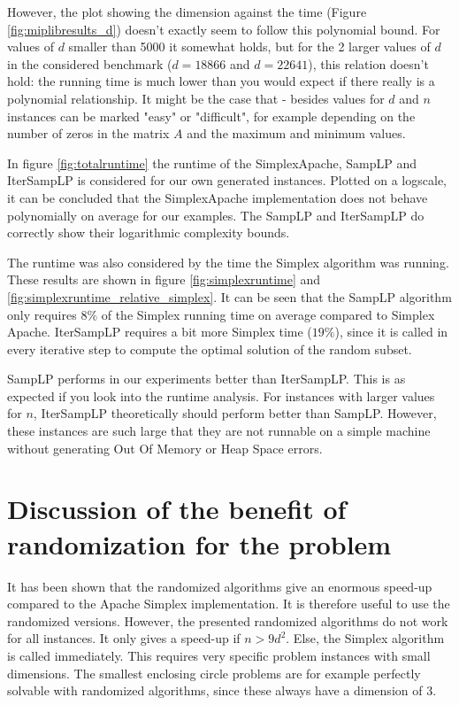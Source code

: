 \documentclass[nocopyrightspace]{acm_proc_article-sp}
\begin{document}
However, the plot showing the dimension against the time (Figure \ref{fig:miplibresults_d}) doesn't exactly seem to follow this polynomial bound. For values of $d$ smaller than 5000 it somewhat holds, but for the 2 larger values of $d$ in the considered benchmark ($d=18866$ and $d=22641$), this relation doesn't hold: the running time is much lower than you would expect if there really is a polynomial relationship. It might be the case that - besides values for $d$ and $n$ instances can be marked "easy" or "difficult", for example depending on the number of zeros in the matrix $A$ and the maximum and minimum values.

In figure \ref{fig:totalruntime} the runtime of the SimplexApache, SampLP and IterSampLP is considered for our own generated instances. Plotted on a logscale, it can be concluded that the SimplexApache implementation does not behave polynomially on average for our examples. The SampLP and IterSampLP do correctly show their logarithmic complexity bounds. 

The runtime was also considered by the time the Simplex algorithm was running. These results are shown in figure \ref{fig:simplexruntime} and \ref{fig:simplexruntime_relative_simplex}. It can be seen that the SampLP algorithm only requires $8\%$ of the Simplex running time on average compared to Simplex Apache. IterSampLP requires a bit more Simplex time ($19\%$), since it is called in every iterative step to compute the optimal solution of the random subset.

SampLP performs in our experiments better than IterSampLP. This is as expected if you look into the runtime analysis. For instances with larger values for $n$, IterSampLP theoretically should perform better than SampLP. However, these instances are such large that they are not runnable on a simple machine without generating Out Of Memory or Heap Space errors.

\section{Discussion of the benefit of randomization for the problem}
It has been shown that the randomized algorithms give an enormous speed-up compared to the Apache Simplex implementation. It is therefore useful to use the randomized versions. However, the presented randomized algorithms do not work for all instances. It only gives a speed-up if $n>9d^2$. Else, the Simplex algorithm is called immediately. This requires very specific problem instances with small dimensions. The smallest enclosing circle problems are for example perfectly solvable with randomized algorithms, since these always have a dimension of 3.
\end{document}
